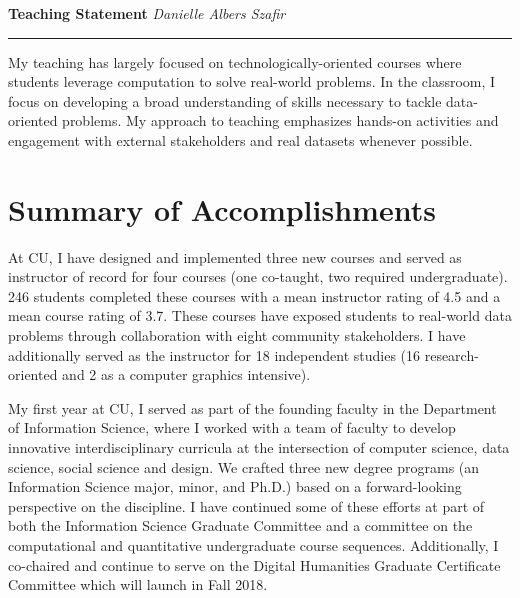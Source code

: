 \documentclass[11pt]{article}
\begin{document}
\setlength{\belowcaptionskip}{-10pt}

\thispagestyle{fancy}

\textbf{\Large Teaching Statement}
{\hspace{220pt}\emph{Danielle Albers Szafir} \vspace{3pt}}
\hrule

My teaching has largely focused on technologically-oriented courses where students leverage computation to solve real-world problems. In the classroom, I focus on developing a broad understanding of skills necessary to tackle data-oriented problems. My approach to teaching emphasizes hands-on activities and engagement with external stakeholders and real datasets whenever possible. 

\section*{Summary of Accomplishments}

At CU, I have designed and implemented three new courses and served as instructor of record for four courses (one co-taught, two required undergraduate). 246 students completed these courses with a mean instructor rating of 4.5 and a mean course rating of 3.7. These courses have exposed students to real-world data problems through collaboration with eight community stakeholders. I have additionally served as the instructor for 18 independent studies (16 research-oriented and 2 as a computer graphics intensive). 

My first year at CU, I served as part of the founding faculty in the Department of Information Science, where I worked with a team of faculty to develop innovative interdisciplinary curricula at the intersection of computer science, data science, social science and design. We crafted three new degree programs (an Information Science major, minor, and Ph.D.) based on a forward-looking perspective on the discipline. I have continued some of these efforts at part of both the Information Science Graduate Committee and a committee on the computational and quantitative undergraduate course sequences. Additionally, I co-chaired and continue to serve on the Digital Humanities Graduate Certificate Committee which will launch in Fall 2018. 
\end{document}
